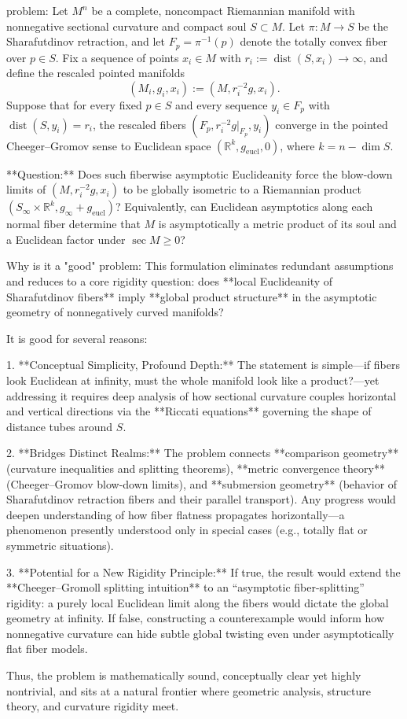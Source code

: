 problem:  
Let \(M^n\) be a complete, noncompact Riemannian manifold with nonnegative sectional curvature and compact soul \(S \subset M\).  
Let \(\pi: M \to S\) be the Sharafutdinov retraction, and let \(F_p = \pi^{-1}(p)\) denote the totally convex fiber over \(p \in S\).  
Fix a sequence of points \(x_i \in M\) with \(r_i := \operatorname{dist}(S,x_i) \to \infty\), and define the rescaled pointed manifolds  
\[
(M_i, g_i, x_i) := (M, r_i^{-2} g, x_i).
\]
Suppose that for every fixed \(p \in S\) and every sequence \(y_i \in F_p\) with \(\operatorname{dist}(S,y_i) = r_i\), the rescaled fibers \((F_p, r_i^{-2} g|_{F_p}, y_i)\) converge in the pointed Cheeger–Gromov sense to Euclidean space \((\mathbb{R}^k, g_{\mathrm{eucl}}, 0)\), where \(k = n - \dim S\).  

**Question:**  
Does such fiberwise asymptotic Euclideanity force the blow-down limits of \((M, r_i^{-2} g, x_i)\) to be globally isometric to a Riemannian product \((S_\infty \times \mathbb{R}^k, g_\infty + g_{\mathrm{eucl}})\)?  
Equivalently, can Euclidean asymptotics along each normal fiber determine that \(M\) is asymptotically a metric product of its soul and a Euclidean factor under \(\sec M \ge 0\)?  

Why is it a "good" problem:  
This formulation eliminates redundant assumptions and reduces to a core rigidity question: does **local Euclideanity of Sharafutdinov fibers** imply **global product structure** in the asymptotic geometry of nonnegatively curved manifolds?  

It is good for several reasons:  

1. **Conceptual Simplicity, Profound Depth:**  
   The statement is simple—if fibers look Euclidean at infinity, must the whole manifold look like a product?—yet addressing it requires deep analysis of how sectional curvature couples horizontal and vertical directions via the **Riccati equations** governing the shape of distance tubes around \(S\).  

2. **Bridges Distinct Realms:**  
   The problem connects **comparison geometry** (curvature inequalities and splitting theorems), **metric convergence theory** (Cheeger–Gromov blow-down limits), and **submersion geometry** (behavior of Sharafutdinov retraction fibers and their parallel transport). Any progress would deepen understanding of how fiber flatness propagates horizontally—a phenomenon presently understood only in special cases (e.g., totally flat or symmetric situations).  

3. **Potential for a New Rigidity Principle:**  
   If true, the result would extend the **Cheeger–Gromoll splitting intuition** to an “asymptotic fiber-splitting” rigidity: a purely local Euclidean limit along the fibers would dictate the global geometry at infinity.  
   If false, constructing a counterexample would inform how nonnegative curvature can hide subtle global twisting even under asymptotically flat fiber models.  

Thus, the problem is mathematically sound, conceptually clear yet highly nontrivial, and sits at a natural frontier where geometric analysis, structure theory, and curvature rigidity meet.